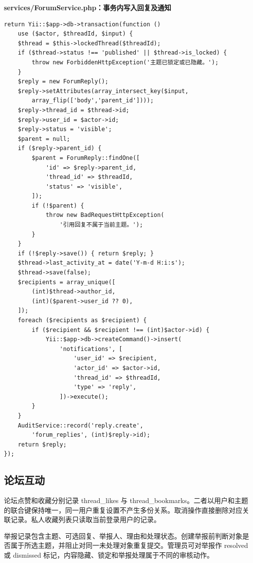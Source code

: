 \documentclass[UTF8,a4paper,11pt]{ctexart}
\begin{document}
\noindent\textbf{services/ForumService.php：事务内写入回复及通知}\par\vspace{2pt}
\begin{lstlisting}
return Yii::$app->db->transaction(function ()
    use ($actor, $threadId, $input) {
    $thread = $this->lockedThread($threadId);
    if ($thread->status !== 'published' || $thread->is_locked) {
        throw new ForbiddenHttpException('主题已锁定或已隐藏。');
    }
    $reply = new ForumReply();
    $reply->setAttributes(array_intersect_key($input,
        array_flip(['body','parent_id'])));
    $reply->thread_id = $thread->id;
    $reply->user_id = $actor->id;
    $reply->status = 'visible';
    $parent = null;
    if ($reply->parent_id) {
        $parent = ForumReply::findOne([
            'id' => $reply->parent_id,
            'thread_id' => $threadId,
            'status' => 'visible',
        ]);
        if (!$parent) {
            throw new BadRequestHttpException(
                '引用回复不属于当前主题。');
        }
    }
    if (!$reply->save()) { return $reply; }
    $thread->last_activity_at = date('Y-m-d H:i:s');
    $thread->save(false);
    $recipients = array_unique([
        (int)$thread->author_id,
        (int)($parent->user_id ?? 0),
    ]);
    foreach ($recipients as $recipient) {
        if ($recipient && $recipient !== (int)$actor->id) {
            Yii::$app->db->createCommand()->insert(
                'notifications', [
                    'user_id' => $recipient,
                    'actor_id' => $actor->id,
                    'thread_id' => $threadId,
                    'type' => 'reply',
                ])->execute();
        }
    }
    AuditService::record('reply.create',
        'forum_replies', (int)$reply->id);
    return $reply;
});
\end{lstlisting}
\subsection{论坛互动}
论坛点赞和收藏分别记录 thread\_likes 与 thread\_bookmarks。二者以用户和主题的联合键保持唯一，同一用户重复设置不产生多份关系。取消操作直接删除对应关联记录。私人收藏列表只读取当前登录用户的记录。

举报记录包含主题、可选回复、举报人、理由和处理状态。创建举报前判断对象是否属于所选主题，并阻止对同一未处理对象重复提交。管理员可对举报作 resolved 或 dismissed 标记，内容隐藏、锁定和举报处理属于不同的审核动作。
\end{document}
